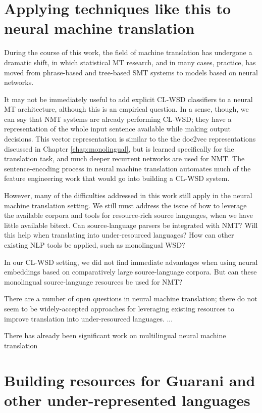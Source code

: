 \section{Applying techniques like this to neural machine translation}
During the course of this work, the field of machine translation has undergone
a dramatic shift, in which statistical MT research, and in many cases,
practice\cite{gnmt}, has moved from phrase-based and tree-based SMT systems to
models based on neural networks.

It may not be immediately useful to add explicit CL-WSD classifiers to a neural
MT architecture, although this is an empirical question.  In a sense, though,
we can say that NMT systems are already performing CL-WSD; they have a
representation of the whole input sentence available while making output
decisions. This vector representation is similar to the the doc2vec
representations discussed in Chapter \ref{chap:monolingual}, but is learned
specifically for the translation task, and much deeper recurrent networks are
used for NMT. The sentence-encoding process in neural machine translation
automates much of the feature engineering work that would go into building a
CL-WSD system.

However, many of the difficulties addressed in this work still apply in the
neural machine translation setting. We still must address the issue of how to
leverage the available corpora and tools for resource-rich source languages,
when we have little available bitext. Can source-language parsers be integrated
with NMT? Will this help when translating into under-resourced languages? How
can other existing NLP tools be applied, such as monolingual WSD?

In our CL-WSD setting, we did not find immediate advantages when using neural
embeddings based on comparatively large source-language corpora. But can these
monolingual source-language resources be used for NMT?

There are a number of open questions in neural machine translation; there do
not seem to be widely-accepted approaches for leveraging existing resources to
improve translation into under-resourced languages. ... %

There has already been significant work on multilingual neural machine
translation \cite{TACL1081}


\section{Building resources for Guarani and other under-represented languages}
\label{sec:crowdsourcing}

